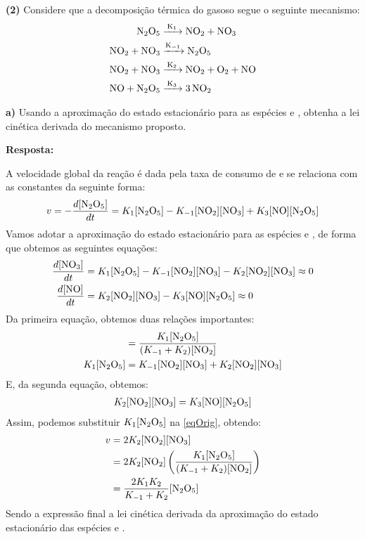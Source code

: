 \textbf{(2)} Considere que a decomposição térmica do  gasoso segue o seguinte mecanismo:
\begin{align*}
    \ce{N2O5 &->[{K_1}] NO2 + NO3}\\
    \ce{NO2 + NO3 &->[{K_{-1}}] N2O5}\\
    \ce{NO2 + NO3 &->[{K_2}] NO2 + O2 + NO}\\
    \ce{NO + N2O5 &->[{K_3}] 3NO2}
\end{align*}

\textbf{a)} Usando a aproximação do estado estacionário para as espécies  e , obtenha a lei cinética derivada do mecanismo proposto.

\textbf{Resposta:}

A velocidade global da reação é dada pela taxa de consumo de  e se relaciona com as constantes da seguinte forma:
\begin{align}\label{eqOrig}
    v = - \frac{d[\ce{N2O5}]}{dt} = K_1 [\ce{N2O5}] - K_{-1} [\ce{NO2}][\ce{NO3}] + K_3 [\ce{NO}][\ce{N2O5}]
\end{align}
Vamos adotar a aproximação do estado estacionário para as espécies  e , de forma que obtemos as seguintes equações:
\begin{align*}
    \frac{d[\ce{NO3}]}{dt} &= K_1 [\ce{N2O5}] - K_{-1} [\ce{NO2}][\ce{NO3}] - K_2 [\ce{NO2}][\ce{NO3}] \approx 0\\
    \frac{d[\ce{NO}]}{dt} &= K_2 [\ce{NO2}][\ce{NO3}] - K_3 [\ce{NO}][\ce{N2O5}] \approx 0
\end{align*}
Da primeira equação, obtemos duas relações importantes:
\begin{align*}
    [\ce{NO3}] &= \frac{K_1 [\ce{N2O5}]}{(K_{-1} + K_2) [\ce{NO2}]}\\
    K_1 [\ce{N2O5}] &= K_{-1} [\ce{NO2}][\ce{NO3}] + K_2 [\ce{NO2}][\ce{NO3}]
\end{align*}
E, da segunda equação, obtemos:
\begin{align*}
    K_2 [\ce{NO2}][\ce{NO3}] = K_3 [\ce{NO}][\ce{N2O5}]
\end{align*}
Assim, podemos substituir \( K_1 [\ce{N2O5}] \) na \cref{eqOrig}, obtendo:
\begin{align*}
    v &= 2 K_2 [\ce{NO2}][\ce{NO3}]\\
      &= 2 K_2 [\ce{NO2}] \left( \frac{K_1 [\ce{N2O5}]}{(K_{-1} + K_2) [\ce{NO2}]}  \right) \\
      &= \frac{2 K_1 K_2}{K_{-1} + K_2} [\ce{N2O5}]
\end{align*}
Sendo a expressão final a lei cinética derivada da aproximação do estado estacionário das espécies  e .

